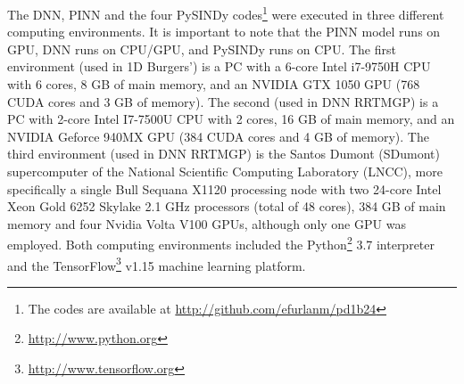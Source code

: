 The DNN, PINN and the four PySINDy codes\footnote{The codes are available at \url{http://github.com/efurlanm/pd1b24}} were executed in three different computing environments. It is important to note that the PINN model runs on GPU, DNN runs on CPU/GPU, and PySINDy runs on CPU. The first environment (used in 1D Burgers') is a PC with a 6-core Intel i7-9750H CPU with 6 cores, 8 GB of main memory, and an NVIDIA GTX 1050 GPU (768 CUDA cores and 3 GB of memory). The second (used in DNN RRTMGP) is a PC with 2-core Intel I7-7500U CPU with 2 cores, 16 GB of main memory, and an NVIDIA Geforce 940MX GPU (384 CUDA cores and 4 GB of memory). The third environment (used in DNN RRTMGP) is the Santos Dumont (SDumont) supercomputer of the National Scientific Computing Laboratory (LNCC), more specifically a single Bull Sequana X1120 processing node with two 24-core Intel Xeon Gold 6252 Skylake 2.1 GHz processors (total of 48 cores), 384 GB of main memory and four Nvidia Volta V100 GPUs, although only one GPU was employed. Both computing environments included the Python\footnote{\url{http://www.python.org}} 3.7 interpreter and the TensorFlow\footnote{\url{http://www.tensorflow.org}} v1.15 machine learning platform.

